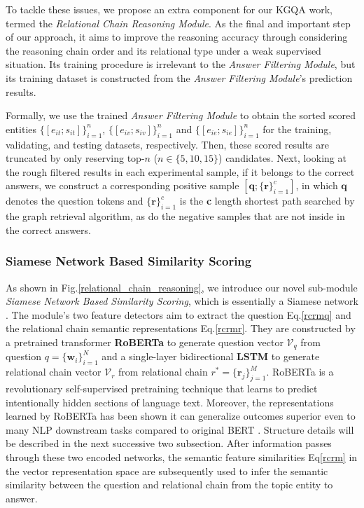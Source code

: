 \documentclass[pdflatex,sn-mathphys]{sn-jnl}%
\theoremstyle{thmstyleone}%
\theoremstyle{thmstyletwo}%
\theoremstyle{thmstylethree}%
\begin{document}
To tackle these issues, we propose an extra component for our KGQA work, termed the \textit{Relational Chain Reasoning Module}. As the final and important step of our approach, it aims to improve the reasoning accuracy through considering the reasoning chain order and its relational type under a weak supervised situation. Its training procedure is irrelevant to the \textit{Answer Filtering Module}, but its training dataset is constructed from the \textit{Answer Filtering Module}'s prediction results.

Formally, we use the trained \textit{Answer Filtering Module} to obtain the sorted scored entities $\{[e_{it}; s_{it}]\}_{i=1}^{n}$, $\{[e_{iv}; s_{iv}]\}_{i=1}^{n}$ and $\{[e_{ie}; s_{ie}]\}_{i=1}^{n}$ for the training, validating, and testing datasets, respectively.
Then, these scored results are truncated by only reserving top-$n$ ($n \in \{5,10,15\}$) candidates. Next, looking at the rough filtered results in each experimental sample, if it belongs to the correct answers, we construct a corresponding positive sample $[\mathbf{q}; \{\mathbf{r}\}_{i=1}^{c}]$, in which $\mathbf{q}$ denotes the question tokens and $\{\mathbf{r}\}_{i=1}^{c}$ is the \textbf{c} length shortest path searched by the graph retrieval algorithm, as do the negative samples that are not inside in the correct answers.

\subsubsection{Siamese Network Based Similarity Scoring}
As shown in Fig.\ref{relational_chain_reasoning}, we introduce our novel sub-module \textit{Siamese Network Based Similarity Scoring}, which is essentially a Siamese network \cite{sia2016jonas}. The module's two feature detectors aim to extract the question Eq.\ref{rcrmq} and the relational chain semantic representations Eq.\ref{rcrmr}. They are constructed by a pretrained transformer \textbf{RoBERTa} \cite{roberta} to generate question vector $\mathcal{V}_{q}$ from question $q =\{\textbf{w}_{i}\}_{i=1}^{N}$ and a single-layer bidirectional \textbf{LSTM} to generate relational chain vector $\mathcal{V}_{r}$ from relational chain $r^{*} =\{\textbf{r}_{j}\}_{j=1}^{M}$. RoBERTa is a revolutionary self-supervised pretraining technique that learns to predict intentionally hidden sections of language text. Moreover, the representations learned by RoBERTa has been shown it can generalize outcomes superior even to many NLP downstream tasks compared to original BERT \cite{google2018bert}. Structure details will be described in the next successive two subsection. After information passes through these two encoded networks, the semantic feature similarities Eq\ref{rcrm} in the vector representation space are subsequently used to infer the semantic similarity between the question and relational chain from the topic entity to answer.
\end{document}
